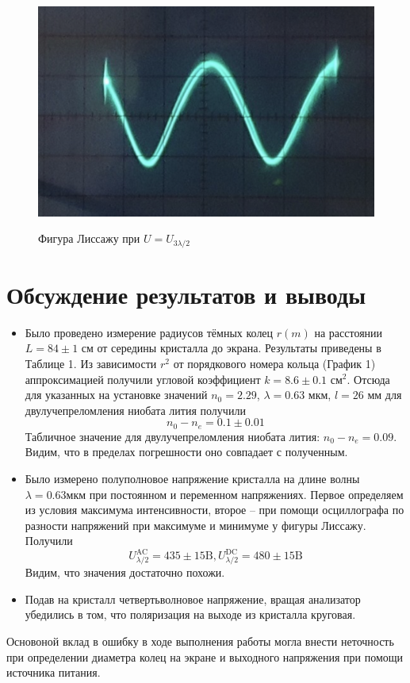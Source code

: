 \documentclass[11pt]{article}
\begin{document}
\begin{figure}[H]
  \centering
  \includegraphics[width=\textwidth]{L3.png}\label{fig:L3}
  \caption{Фигура Лиссажу при \(U = U_{3\lambda/2}\)}
\end{figure}


\section*{Обсуждение результатов и выводы}
\begin{itemize}

\item Было проведено измерение радиусов тёмных колец $r(m)$ на расстоянии $L = 84 \pm 1 $ см от середины кристалла до экрана. Результаты приведены в Таблице 1. Из зависимости $r^2$ от порядкового номера кольца (График 1) аппроксимацией получили угловой коэффициент $k = 8.6 \pm 0.1 \text{ см}^2$. Отсюда для указанных на установке значений $n_0 = 2.29$, $\lambda = 0.63 \text{ мкм}$, $l = 26 \text{ мм}$ для двулучепреломления ниобата лития получили
\[
\boxed{n_0 - n_e = 0.1 \pm 0.01}
\]  
Табличное значение для двулучепреломления ниобата лития: $n_0 - n_e = 0.09$. Видим, что в пределах погрешности оно совпадает с полученным.

\item Было измерено полуполновое напряжение кристалла на длине волны $\lambda = 0.63 \text{мкм}$ при постоянном и переменном напряжениях. Первое определяем из условия максимума интенсивности, второе -- при помощи осциллографа по разности напряжений при максимуме и минимуме у фигуры Лиссажу. Получили 
\[
\boxed{U_{\lambda / 2}^{\text{AC}} = 435 \pm 15 \text{B}},
\boxed{U_{\lambda / 2}^{\text{DC}} = 480 \pm 15 \text{B}}
\]
Видим, что значения достаточно похожи.

\item Подав на кристалл четвертьволновое напряжение, вращая анализатор убедились в том, что поляризация на выходе из кристалла круговая.

\end{itemize}

Основоной вклад в ошибку в ходе выполнения работы могла внести неточность при определении диаметра колец на экране и выходного напряжения при помощи источника питания.
\end{document}
